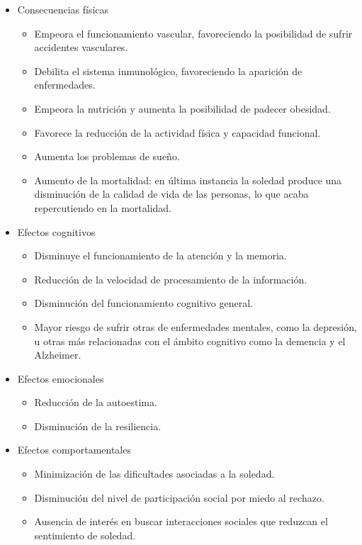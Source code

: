         \begin{itemize}
            \item Consecuencias físicas
                \begin{itemize}
                    \item Empeora el funcionamiento vascular, favoreciendo la posibilidad de sufrir accidentes vasculares.
                    \item Debilita el sistema inmunológico, favoreciendo la aparición de enfermedades.
                    \item Empeora la nutrición y aumenta la posibilidad de padecer obesidad.
                    \item Favorece la reducción de la actividad física y capacidad funcional.
                    \item Aumenta los problemas de sueño.
                    \item Aumento de la mortalidad: en última instancia la soledad produce una disminución de la calidad de vida de las personas, lo que acaba repercutiendo en la mortalidad.
                \end{itemize}
            \item Efectos cognitivos
                \begin{itemize}
                    \item Disminuye el funcionamiento de la atención y la memoria.
                    \item Reducción de la velocidad de procesamiento de la información.
                    \item Disminución del funcionamiento cognitivo general.
                    \item Mayor riesgo de sufrir otras de enfermedades mentales, como la depresión, u otras más relacionadas con el ámbito cognitivo como la demencia y el Alzheimer.
                \end{itemize}
            \item Efectos emocionales
                \begin{itemize}
                    \item Reducción de la autoestima.
                    \item Disminución de la resiliencia.
                \end{itemize}
            \item Efectos comportamentales
                \begin{itemize}
                    \item Minimización de las dificultades asociadas a la soledad.
                    \item Disminución del nivel de participación social por miedo al rechazo.
                    \item Ausencia de interés en buscar interacciones sociales que reduzcan el sentimiento de soledad.
                \end{itemize}
        \end{itemize}
    
